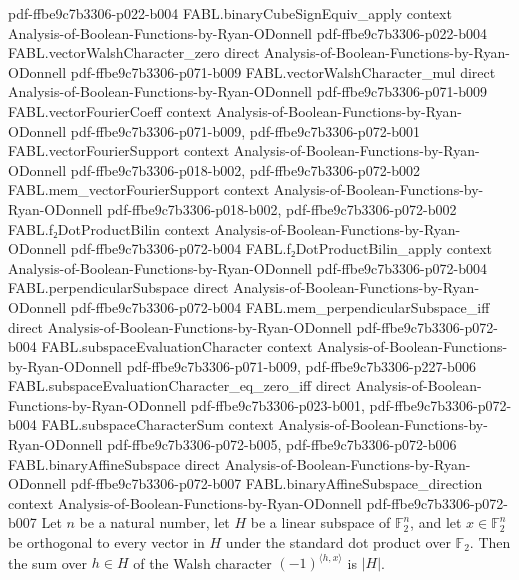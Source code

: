 \begin{theorem}
  {pdf-ffbe9c7b3306-p022-b004}
\proofstep
  {FABL.binaryCubeSignEquiv_apply}
  {context}
  {Analysis-of-Boolean-Functions-by-Ryan-ODonnell}
  {pdf-ffbe9c7b3306-p022-b004}
\proofstep
  {FABL.vectorWalshCharacter_zero}
  {direct}
  {Analysis-of-Boolean-Functions-by-Ryan-ODonnell}
  {pdf-ffbe9c7b3306-p071-b009}
\proofstep
  {FABL.vectorWalshCharacter_mul}
  {direct}
  {Analysis-of-Boolean-Functions-by-Ryan-ODonnell}
  {pdf-ffbe9c7b3306-p071-b009}
\proofstep
  {FABL.vectorFourierCoeff}
  {context}
  {Analysis-of-Boolean-Functions-by-Ryan-ODonnell}
  {pdf-ffbe9c7b3306-p071-b009,
    pdf-ffbe9c7b3306-p072-b001}
\proofstep
  {FABL.vectorFourierSupport}
  {context}
  {Analysis-of-Boolean-Functions-by-Ryan-ODonnell}
  {pdf-ffbe9c7b3306-p018-b002,
    pdf-ffbe9c7b3306-p072-b002}
\proofstep
  {FABL.mem_vectorFourierSupport}
  {context}
  {Analysis-of-Boolean-Functions-by-Ryan-ODonnell}
  {pdf-ffbe9c7b3306-p018-b002,
    pdf-ffbe9c7b3306-p072-b002}
\proofstep
  {FABL.f₂DotProductBilin}
  {context}
  {Analysis-of-Boolean-Functions-by-Ryan-ODonnell}
  {pdf-ffbe9c7b3306-p072-b004}
\proofstep
  {FABL.f₂DotProductBilin_apply}
  {context}
  {Analysis-of-Boolean-Functions-by-Ryan-ODonnell}
  {pdf-ffbe9c7b3306-p072-b004}
\proofstep
  {FABL.perpendicularSubspace}
  {direct}
  {Analysis-of-Boolean-Functions-by-Ryan-ODonnell}
  {pdf-ffbe9c7b3306-p072-b004}
\proofstep
  {FABL.mem_perpendicularSubspace_iff}
  {direct}
  {Analysis-of-Boolean-Functions-by-Ryan-ODonnell}
  {pdf-ffbe9c7b3306-p072-b004}
\proofstep
  {FABL.subspaceEvaluationCharacter}
  {context}
  {Analysis-of-Boolean-Functions-by-Ryan-ODonnell}
  {pdf-ffbe9c7b3306-p071-b009,
    pdf-ffbe9c7b3306-p227-b006}
\proofstep
  {FABL.subspaceEvaluationCharacter_eq_zero_iff}
  {direct}
  {Analysis-of-Boolean-Functions-by-Ryan-ODonnell}
  {pdf-ffbe9c7b3306-p023-b001,
    pdf-ffbe9c7b3306-p072-b004}
\proofstep
  {FABL.subspaceCharacterSum}
  {context}
  {Analysis-of-Boolean-Functions-by-Ryan-ODonnell}
  {pdf-ffbe9c7b3306-p072-b005,
    pdf-ffbe9c7b3306-p072-b006}
\proofstep
  {FABL.binaryAffineSubspace}
  {direct}
  {Analysis-of-Boolean-Functions-by-Ryan-ODonnell}
  {pdf-ffbe9c7b3306-p072-b007}
\proofstep
  {FABL.binaryAffineSubspace_direction}
  {context}
  {Analysis-of-Boolean-Functions-by-Ryan-ODonnell}
  {pdf-ffbe9c7b3306-p072-b007}
Let $n$ be a natural number, let $H$ be a linear subspace of $\mathbb{F}_2^n$, and let
$x\in\mathbb{F}_2^n$ be orthogonal to every vector in $H$ under the standard dot product
over $\mathbb{F}_2$. Then the sum over $h\in H$ of the Walsh character $(-1)^{\langle
h,x\rangle}$ is $|H|$.
\end{theorem}

